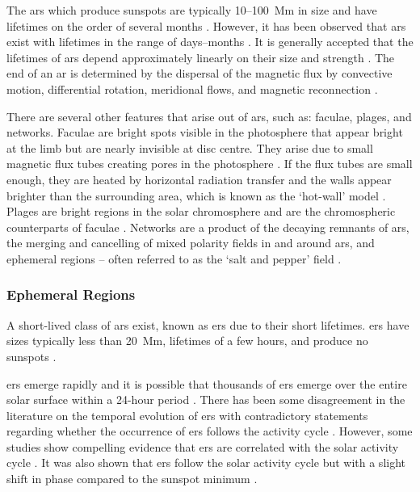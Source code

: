 The \glspl{ar} which produce sunspots are typically 10--100~Mm in size and have lifetimes on the order of several months \citep{zwaan_solar_1981, schrijver_photospheric_1994, canfield_solar_2001, van_driel-gesztelyi_evolution_2015}. However, it has been observed that \glspl{ar} exist with lifetimes in the range of days--months \citep{schrijver_solar_2008}. It is generally accepted that the lifetimes of \glspl{ar} depend approximately linearly on their size and strength \citep{canfield_solar_2001, schrijver_solar_2008}. The end of an \gls{ar} is determined by the dispersal of the magnetic flux by convective motion, differential rotation, meridional flows, and magnetic reconnection \citep{canfield_solar_2001}.


There are several other features that arise out of \glspl{ar}, such as: faculae, plages, and networks. Faculae are bright spots visible in the photosphere that appear bright at the limb but are nearly invisible at disc centre. They arise due to small magnetic flux tubes creating pores in the photosphere \citep{solovev_structure_2019}. If the flux tubes are small enough, they are heated by horizontal radiation transfer and the walls appear brighter than the surrounding area, which is known as the `hot-wall' model \citep{spruit_pressure_1976, keller_origin_2004}. Plages are bright regions in the solar chromosphere and are the chromospheric counterparts of faculae \citep{pillet_active_1997}. Networks are a product of the decaying remnants of \glspl{ar}, the merging and cancelling of mixed polarity fields in and around \glspl{ar}, and ephemeral regions -- often referred to as the `salt and pepper' field \citep{martin_identification_1988}.


\glsresetall 
{}
\subsubsection*{Ephemeral Regions}

A short-lived class of \glspl{ar} exist, known as \glspl{er} due to their short lifetimes.  \glspl{er} have sizes typically less than 20~Mm, lifetimes of a few hours, and produce no sunspots \citep{harvey_solar_2001}.

\glspl{er} emerge rapidly and it is possible that thousands of \glspl{er} emerge over the entire solar surface within a 24-hour period \citep{harvey_solar_2001}. There has been some disagreement in the literature on the temporal evolution of \glspl{er} with contradictory statements regarding whether the occurrence of \glspl{er} follows the activity cycle \citep[see][]{harvey_properties_1993, hagenaar_ephemeral_2001, vieira_evolution_2010}. However, some studies show compelling evidence that \glspl{er} are correlated with the solar activity cycle \citep[see e.g.][and references therein]{vieira_evolution_2010,chaplin_sensitivity_2019}. It was also shown that \glspl{er} follow the solar activity cycle but with a slight shift in phase compared to the sunspot minimum \citep{harvey_ephemeral_1973, martin_ephemeral_1979}.

